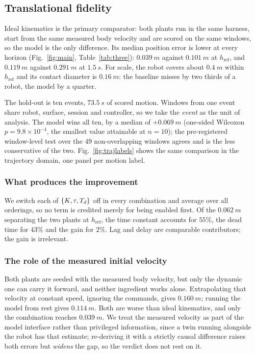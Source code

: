 \subsection{Translational fidelity}
\label{sec:results:rsim}

Ideal kinematics is the primary comparator: both plants run in the same
harness, start from the same measured body velocity and are scored on the same
windows, so the model is the only difference. Its median position error is
lower at every horizon (Fig.~\ref{fig:main}, Table~\ref{tab:three}):
$\SI{0.039}{m}$ against $\SI{0.101}{m}$ at $h_{\mathrm{ref}}$, and
$\SI{0.119}{m}$ against $\SI{0.291}{m}$ at $\SI{1.5}{s}$. For scale, the robot
covers about $\SI{0.4}{m}$ within $h_{\mathrm{ref}}$ and its contact diameter is
$\SI{0.16}{m}$: the baseline misses by two thirds of a robot, the model by a
quarter.

The hold-out is ten events, $\SI{73.5}{s}$ of scored motion. Windows from one
event share robot, surface, session and controller, so we take the \emph{event}
as the unit of analysis. The model wins all ten, by a median of
$+\SI{0.069}{m}$ (one-sided Wilcoxon $p = 9.8\times10^{-4}$, the smallest value
attainable at $n = 10$); the pre-registered window-level test over the $49$ non-overlapping windows
agrees and is the less conservative of the two.\ifkeeptrajfig{} Fig.~\ref{fig:trajlabels} shows the same comparison in the trajectory domain, one panel per motion label.\fi



\subsubsection{What produces the improvement}
We switch each of $\{K,\tau,T_{d}\}$ off in every combination and average over all
orderings, so no term is credited merely for being enabled first. Of the
$\SI{0.062}{m}$ separating the two plants at $h_{\mathrm{ref}}$, the time
constant accounts for $55\%$, the dead time for $43\%$ and the gain for $2\%$.
Lag and delay are comparable contributors; the gain is irrelevant.

\subsubsection{The role of the measured initial velocity}
Both plants are seeded with the measured body velocity, but only the dynamic one
can carry it forward, and neither ingredient works alone. Extrapolating that
velocity at constant speed, ignoring the commands, gives $\SI{0.160}{m}$;
running the model from rest gives $\SI{0.114}{m}$. Both are worse than ideal
kinematics, and only the combination reaches $\SI{0.039}{m}$. We treat the
measured velocity as part of the model interface rather than privileged
information, since a twin running alongside the robot has that estimate;
re-deriving it with a strictly causal difference raises both errors but
\emph{widens} the gap, so the verdict does not rest on it.

